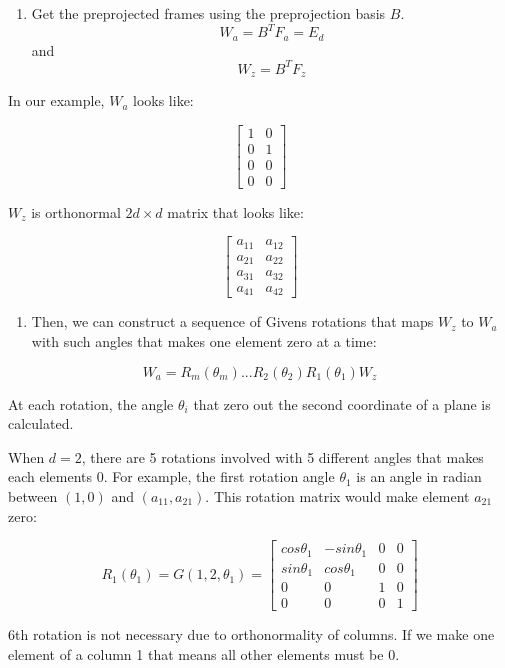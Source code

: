 \begin{enumerate}
\def\labelenumi{\arabic{enumi}.}
\setcounter{enumi}{1}
\tightlist
\item
  Get the preprojected frames using the preprojection basis \(B\).
  \[W_a = B^TF_a = E_d\] and \[W_z = B^TF_z\]
\end{enumerate}

In our example, \(W_a\) looks like:

\[ \begin{bmatrix}1 & 0 \\0  &1 \\ 0&0 \\0&0\end{bmatrix} \]

\(W_z\) is orthonormal \(2d\times d\) matrix that looks like:

\[ \begin{bmatrix} a_{11} & a_{12} \\a_{21}  &a_{22} \\ a_{31}&a_{32} \\a_{41}&a_{42}\end{bmatrix} \]

\begin{enumerate}
\def\labelenumi{\arabic{enumi}.}
\setcounter{enumi}{2}
\tightlist
\item
  Then, we can construct a sequence of Givens rotations that maps
  \(W_z\) to \(W_a\) with such angles that makes one element zero at a
  time:
\end{enumerate}

\[ W_a = R_m(\theta_m) ... R_2(\theta_2)R_1(\theta_1)W_z\]

At each rotation, the angle \(\theta_i\) that zero out the second
coordinate of a plane is calculated.

When \(d = 2\), there are 5 rotations involved with 5 different angles
that makes each elements 0. For example, the first rotation angle
\(\theta_1\) is an angle in radian between \((1, 0)\) and
\((a_{11}, a_{21})\). This rotation matrix would make element \(a_{21}\)
zero:

\[R_1(\theta_1) = G(1, 2, \theta_1) = \begin{bmatrix} cos\theta_1 & -sin\theta_1 & 0 & 0 \\sin\theta_1  &cos\theta_1 & 0 &0 \\ 0&0&1&0 \\0&0&0&1\end{bmatrix}\]

6th rotation is not necessary due to orthonormality of columns. If we
make one element of a column 1 that means all other elements must be 0.

